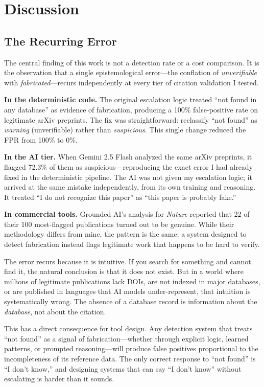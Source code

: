 \section{Discussion}

\subsection{The Recurring Error}

The central finding of this work is not a detection rate or a cost comparison. It is the observation that a single epistemological error---the conflation of \emph{unverifiable} with \emph{fabricated}---recurs independently at every tier of citation validation I tested.

\textbf{In the deterministic code.} The original escalation logic treated ``not found in any database'' as evidence of fabrication, producing a 100\% false-positive rate on legitimate arXiv preprints. The fix was straightforward: reclassify ``not found'' as \textit{warning} (unverifiable) rather than \textit{suspicious}. This single change reduced the FPR from 100\% to 0\%.

\textbf{In the AI tier.} When Gemini 2.5 Flash analyzed the same arXiv preprints, it flagged 72.3\% of them as suspicious---reproducing the exact error I had already fixed in the deterministic pipeline. The AI was not given my escalation logic; it arrived at the same mistake independently, from its own training and reasoning. It treated ``I do not recognize this paper'' as ``this paper is probably fake.''

\textbf{In commercial tools.} Grounded AI's analysis for \textit{Nature} \citep{naddaf2026} reported that 22 of their 100 most-flagged publications turned out to be genuine. While their methodology differs from mine, the pattern is the same: a system designed to detect fabrication instead flags legitimate work that happens to be hard to verify.

The error recurs because it is intuitive. If you search for something and cannot find it, the natural conclusion is that it does not exist. But in a world where millions of legitimate publications lack DOIs, are not indexed in major databases, or are published in languages that AI models under-represent, that intuition is systematically wrong. The absence of a database record is information about the \emph{database}, not about the citation.

This has a direct consequence for tool design. Any detection system that treats ``not found'' as a signal of fabrication---whether through explicit logic, learned patterns, or prompted reasoning---will produce false positives proportional to the incompleteness of its reference data. The only correct response to ``not found'' is ``I don't know,'' and designing systems that can say ``I don't know'' without escalating is harder than it sounds.

